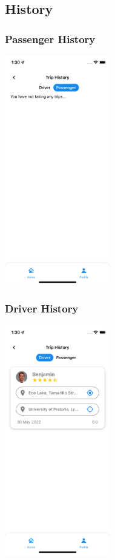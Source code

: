 \documentclass[hidelinks, 12pt, a4paper]{article}
\begin{document}
\subsection{History}
\subsubsection{Passenger History}
\begin{center}
  \includegraphics[height=10cm]{images/history_passenger.png}
\end{center}
\subsubsection{Driver History}
\begin{center}
  \includegraphics[height=10cm]{images/history_driver.png}
\end{center}
\vspace{1cm}
\end{document}
